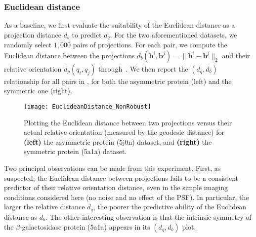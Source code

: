 

\subsubsection{Euclidean distance}\label{sec:results:distance-estimation:euclidean}


As a baseline, we first evaluate the suitability of the Euclidean distance as a projection distance $d_b$ to predict $d_q$. For the two aforementioned datasets, we randomly select $1,000$ pairs of projections. For each pair, we compute the Euclidean distance between the projections $d_b(\mathbf{b}^i,\mathbf{b}^j)=\lVert\mathbf{b}^i-\mathbf{b}^j\rVert_2$ and their relative orientation $d_p(q_i,q_j)$ through~. We then report the $(d_q,d_b)$ relationship for all pairs in , for both the asymmetric protein (left) and the symmetric one (right).

\begin{figure}
    \centering
    \texttt{[image: EuclideanDistance\_NonRobust]}
    \caption{
        Plotting the Euclidean distance between two projections versus their actual relative orientation (measured by the geodesic distance) for \textbf{(left)} the asymmetric protein (5j0n) dataset, and \textbf{(right)} the symmetric protein (5a1a) dataset.
    }
    \label{fig:euclidean-not-robust}
\end{figure}

Two principal observations can be made from this experiment. First, as suspected, the Euclidean distance between projections fails to be a consistent predictor of their relative orientation distance, even in the simple imaging conditions considered here (no noise and no effect of the PSF). In particular, the larger the relative distance $d_q$, the poorer the predictive ability of the Euclidean distance as $d_b$. The other interesting observation is that the intrinsic symmetry of the $\beta$-galactosidase protein (5a1a) appears in its $(d_q,d_b)$ plot.


